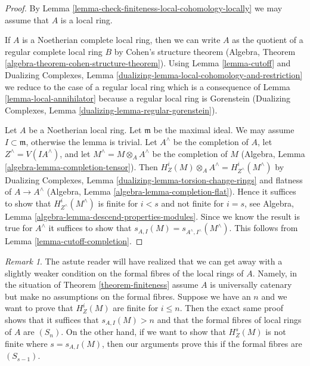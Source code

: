 \documentclass{stacks-project}
\theoremstyle{plain}
\theoremstyle{definition}
\theoremstyle{remark}
\newtheorem{remark}[subsection]{Remark}
\numberwithin{equation}{subsection}
\begin{document}
\begin{proof}
By Lemma \ref{lemma-check-finiteness-local-cohomology-locally}
we may assume that $A$ is a local ring.

\medskip\noindent
If $A$ is a Noetherian complete local ring, then we can write $A$
as the quotient of a regular complete local ring $B$ by
Cohen's structure theorem
(Algebra, Theorem \ref{algebra-theorem-cohen-structure-theorem}).
Using Lemma \ref{lemma-cutoff} and
Dualizing Complexes, Lemma
\ref{dualizing-lemma-local-cohomology-and-restriction}
we reduce to the case
of a regular local ring which is a consequence of
Lemma \ref{lemma-local-annihilator}
because a regular local ring is Gorenstein
(Dualizing Complexes, Lemma \ref{dualizing-lemma-regular-gorenstein}).

\medskip\noindent
Let $A$ be a Noetherian local ring. Let $\mathfrak m$ be the maximal ideal.
We may assume $I \subset \mathfrak m$, otherwise the lemma is trivial.
Let $A^\wedge$ be the completion of $A$, let $Z^\wedge = V(IA^\wedge)$, and
let $M^\wedge = M \otimes_A A^\wedge$ be the completion of $M$
(Algebra, Lemma \ref{algebra-lemma-completion-tensor}).
Then $H^i_Z(M) \otimes_A A^\wedge = H^i_{Z^\wedge}(M^\wedge)$ by
Dualizing Complexes, Lemma \ref{dualizing-lemma-torsion-change-rings}
and flatness of $A \to A^\wedge$
(Algebra, Lemma \ref{algebra-lemma-completion-flat}).
Hence it suffices to show that $H^i_{Z^\wedge}(M^\wedge)$ is
finite for $i < s$ and not finite for $i = s$, see
Algebra, Lemma \ref{algebra-lemma-descend-properties-modules}.
Since we know the result is true for $A^\wedge$ it suffices
to show that $s_{A, I}(M) = s_{A^\wedge, I^\wedge}(M^\wedge)$.
This follows from Lemma \ref{lemma-cutoff-completion}.
\end{proof}

\begin{remark}
\label{remark-astute-reader}
The astute reader will have realized that we can get away with a
slightly weaker condition on the formal fibres of the local rings
of $A$. Namely, in the situation of Theorem \ref{theorem-finiteness}
assume $A$ is universally catenary but make no assumptions on
the formal fibres. Suppose we have an $n$ and we want to prove that
$H^i_Z(M)$ are finite for $i \leq n$. Then the exact same proof
shows that it suffices that $s_{A, I}(M) > n$ and that
the formal fibres of local rings of $A$ are $(S_n)$.
On the other hand, if we want to show that $H^s_Z(M)$
is not finite where $s = s_{A, I}(M)$, then our arguments prove
this if the formal fibres are $(S_{s - 1})$.
\end{remark}
\end{document}
